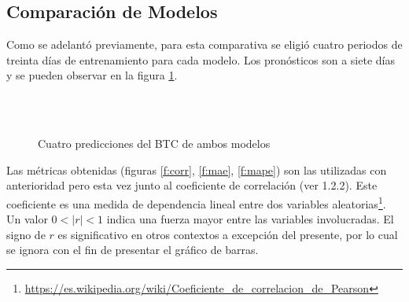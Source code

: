 \documentclass[a4paper,10pt]{article}
\begin{document}
\subsection{Comparación de Modelos}

Como se adelantó previamente, para esta comparativa se eligió cuatro periodos de treinta días de entrenamiento para cada modelo. Los pronósticos son a siete días y se pueden observar en la figura \ref{f:btc_ax_ph}.

\begin{figure}[H]
 \centering
   \\
    \\
  \caption{Cuatro predicciones del BTC de ambos modelos}
  \label{f:btc_ax_ph}
\end{figure}

Las métricas obtenidas (figuras \ref{f:corr}, \ref{f:mae}, \ref{f:mape}) son las utilizadas con anterioridad pero esta vez junto al coeficiente de correlación (ver 1.2.2). Este coeficiente es una medida de dependencia lineal entre dos variables aleatorias\footnote{\url{https://es.wikipedia.org/wiki/Coeficiente_de_correlacion_de_Pearson}}. Un valor $0<|r|<1$ indica una fuerza mayor entre las variables involucradas. El signo de $r$ es significativo en otros contextos a excepción del presente, por lo cual se ignora con el fin de presentar el gráfico de barras.
\end{document}
